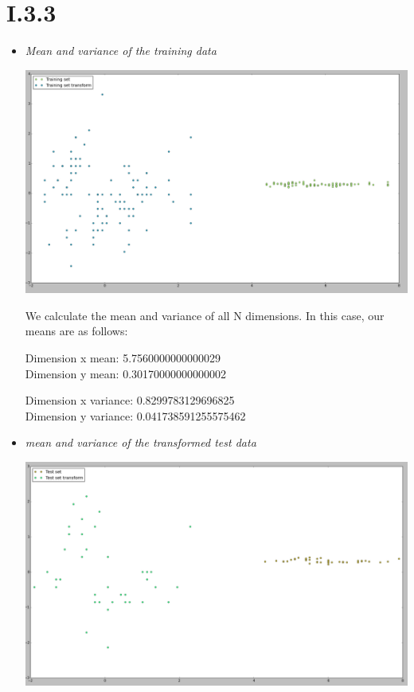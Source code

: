 \documentclass[12pt, a4paper]{article}
\begin{document}
\section{I.3.3}
\begin{itemize}
\item \textit{Mean and variance of the training data}

\includegraphics[width=\textwidth]{8.png}

We calculate the mean and variance of all N dimensions. In this case, our means are as follows:

Dimension x mean: 5.7560000000000029 \\
Dimension y mean: 0.30170000000000002

Dimension x variance: 0.8299783129696825 \\
Dimension y variance: 0.041738591255575462

\item \textit{mean and variance of the transformed test data}

\includegraphics[width=\textwidth]{9.png}


\end{itemize}
\end{document}
